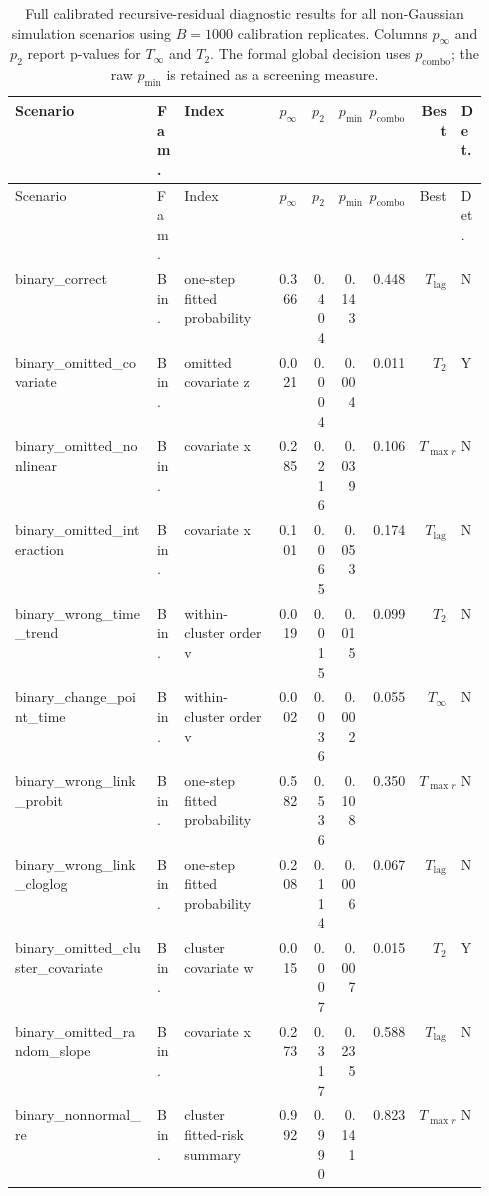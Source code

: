 \begingroup
\tiny
\setlength{\tabcolsep}{1.8pt}
\renewcommand{\arraystretch}{0.92}
\begin{longtable}{p{0.30\linewidth}p{0.05\linewidth}p{0.20\linewidth}rrrrrl}
\caption{Full calibrated recursive-residual diagnostic results for all non-Gaussian simulation scenarios using $B=1000$ calibration replicates. Columns $p_\infty$ and $p_2$ report p-values for $T_\infty$ and $T_2$. The formal global decision uses $p_{\mathrm{combo}}$; the raw $p_{\min}$ is retained as a screening measure.}\label{tab:simulation-catalogue-full}\\
\toprule
Scenario & Fam. & Index & $p_\infty$ & $p_2$ & $p_{\min}$ & $p_{\mathrm{combo}}$ & Best & Det. \\
\midrule
\endfirsthead
\toprule
Scenario & Fam. & Index & $p_\infty$ & $p_2$ & $p_{\min}$ & $p_{\mathrm{combo}}$ & Best & Det. \\
\midrule
\endhead
\bottomrule
\endfoot
binary\_correct & Bin. & one-step fitted probability & 0.366 & 0.404 & 0.143 & 0.448 & $T_{\mathrm{lag}}$ & N \\
binary\_omitted\_covariate & Bin. & omitted covariate z & 0.021 & 0.004 & 0.004 & 0.011 & $T_2$ & Y \\
binary\_omitted\_nonlinear & Bin. & covariate x & 0.285 & 0.216 & 0.039 & 0.106 & $T_{\max r}$ & N \\
binary\_omitted\_interaction & Bin. & covariate x & 0.101 & 0.065 & 0.053 & 0.174 & $T_{\mathrm{lag}}$ & N \\
binary\_wrong\_time\_trend & Bin. & within-cluster order v & 0.019 & 0.015 & 0.015 & 0.099 & $T_2$ & N \\
binary\_change\_point\_time & Bin. & within-cluster order v & 0.002 & 0.036 & 0.002 & 0.055 & $T_\infty$ & N \\
binary\_wrong\_link\_probit & Bin. & one-step fitted probability & 0.582 & 0.536 & 0.108 & 0.350 & $T_{\max r}$ & N \\
binary\_wrong\_link\_cloglog & Bin. & one-step fitted probability & 0.208 & 0.114 & 0.006 & 0.067 & $T_{\mathrm{lag}}$ & N \\
binary\_omitted\_cluster\_covariate & Bin. & cluster covariate w & 0.015 & 0.007 & 0.007 & 0.015 & $T_2$ & Y \\
binary\_omitted\_random\_slope & Bin. & covariate x & 0.273 & 0.317 & 0.235 & 0.588 & $T_{\mathrm{lag}}$ & N \\
binary\_nonnormal\_re & Bin. & cluster fitted-risk summary & 0.992 & 0.990 & 0.141 & 0.823 & $T_{\max r}$ & N \\

\end{longtable}
